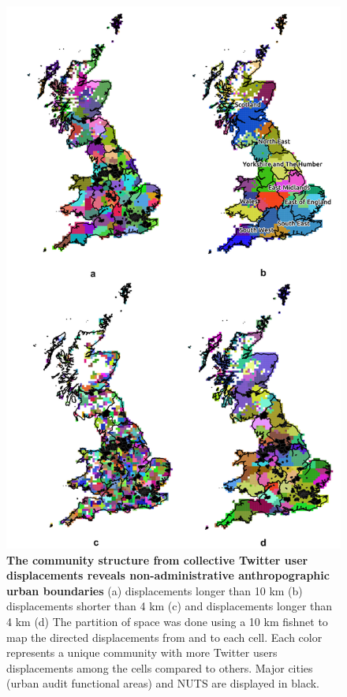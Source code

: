 \documentclass[]{tGIS2e}
\begin{document}
{\begin{figure}[ht]
\begin{center}
\includegraphics[width=0.9\linewidth]{./figure/S5_community}
\caption{{\bf The community structure from collective Twitter user displacements reveals non-administrative anthropographic urban boundaries} (a) displacements longer than 10 km (b) displacements shorter than 4 km (c) and displacements longer than 4 km (d) The partition of space was done using a 10 km fishnet to map the directed displacements from and to each cell. Each color represents a unique community with more Twitter users displacements among the cells compared to others. Major cities (urban audit functional areas) and NUTS are displayed in black.}
\label{S5_Fig}
\end{center}
\end{figure}

}
\end{document}
